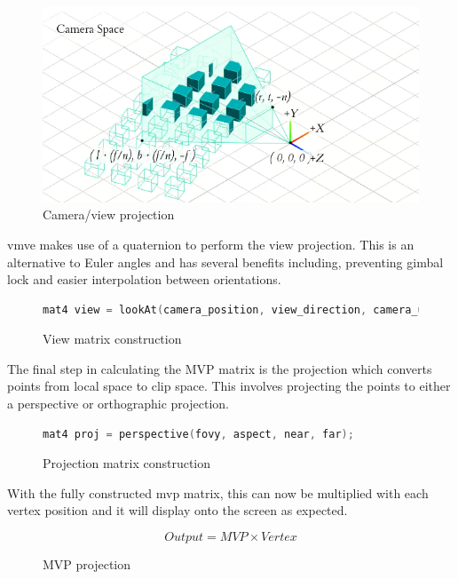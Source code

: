 \documentclass[11pt]{article}
\begin{document}
\begin{figure}[h!]
  \centering
  \includegraphics[width=\textwidth]{images/camera_space.png}
  \caption{Camera/view projection \cite{camera_projection}}
  \label{fig:camera_projection} 
\end{figure}

\gls{vmve} makes use of a quaternion to perform the view projection. This is an
alternative to Euler angles and has several benefits including, preventing gimbal
lock and easier interpolation between orientations.
\begin{figure}[ht]
  \centering
  \begin{lstlisting}[language=C++]
    mat4 view = lookAt(camera_position, view_direction, camera_up);
  \end{lstlisting}
  \caption{View matrix construction}
  \label{fig:world_to_view}
\end{figure}


The final step in calculating the MVP matrix is the projection which converts
points from local space to clip space. This involves projecting the points to
either a perspective or orthographic projection.
\begin{figure}[ht]
  \centering
  \begin{lstlisting}[language=C++]
    mat4 proj = perspective(fovy, aspect, near, far);
  \end{lstlisting}
  \caption{Projection matrix construction}
  \label{fig:local_to_projection}
\end{figure}

With the fully constructed mvp matrix, this can now be multiplied with each
vertex position and it will display onto the screen as expected.
\begin{figure}[h!]
  \centering  
  \begin{equation}
    Output = MVP \times Vertex
  \end{equation}
  \caption{MVP projection}
  \label{fig:mvp_projection}
\end{figure}
\end{document}
